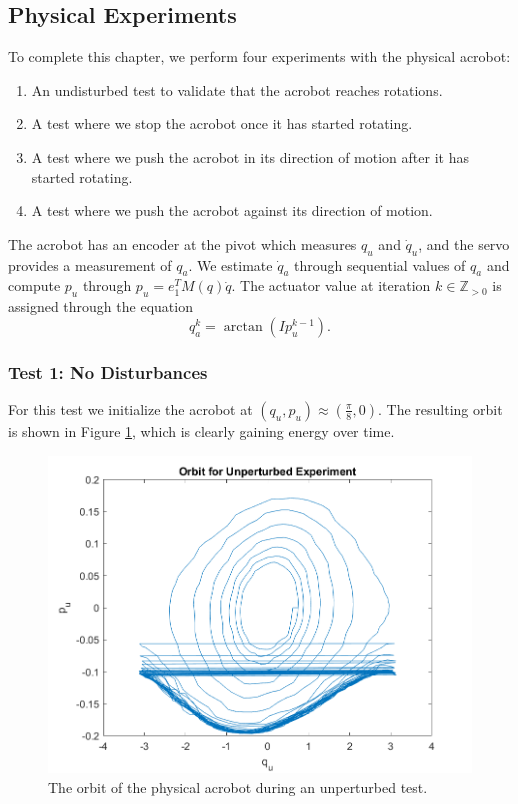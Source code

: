 \subsection{Physical Experiments}
To complete this chapter, we perform four experiments with the physical
acrobot:
\begin{enumerate}
    \item An undisturbed test to validate that the acrobot reaches rotations.
    \item A test where we stop the acrobot once it has started rotating.
    \item A test where we push the acrobot in its direction of motion after it has
        started rotating.
    \item A test where we push the acrobot against its direction of motion.
\end{enumerate}

The acrobot has an encoder at the pivot which measures \(q_u\) and
\(\dot{q}_u\), and the servo provides a measurement of \(q_a\).
We estimate \(\dot{q}_a\) through sequential values of \(q_a\) and
compute \(p_u\) through \(p_u = e_1^T M(q) \dot{q}\).
The actuator value at iteration \(k \in \mathbb{Z}_{> 0}\) is assigned through
the equation
\[
    q_a^{k} = \arctan(I p_u^{k-1})
    .
\]

\subsubsection*{Test 1: No Disturbances}
For this test we initialize the acrobot at 
\((q_u,p_u) \approx \left(\frac{\pi}{8},0\right)\). 
The resulting orbit is shown in Figure \ref{fig:acrobot-unperturbed-orbit},
which is clearly gaining energy over time.

\begin{figure}[ht]
    \centering
    \includegraphics[width=0.5\linewidth]{images/acrobot_unperturbed_orbit.png}
    \caption{The orbit of the physical acrobot during an unperturbed test.}
    \label{fig:acrobot-unperturbed-orbit}
\end{figure}

